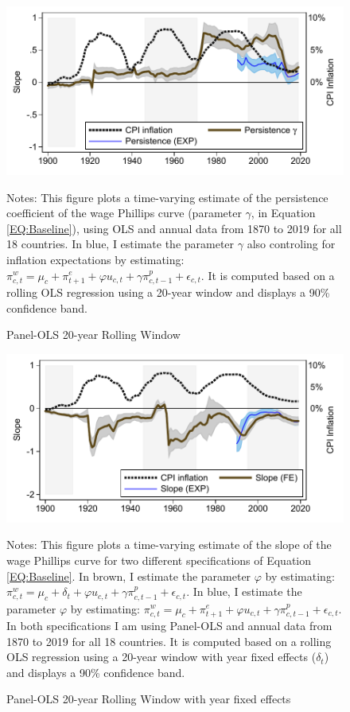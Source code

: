 \documentclass[12pt]{article}
\newcommand{\annote}[1]{\parbox{\textwidth}{\renewcommand{\baselinestretch}{1.0}\vspace{12pt} \footnotesize Notes: #1}}
\begin{document}
\begin{appendices}
\begin{singlespace}
\begin{figure}[h!]
    \centering
    \caption{Panel-OLS 20-year Rolling Window}
    \includegraphics[scale=0.9]{../Output/Figures/Figure_A2}
    \annote{\footnotesize This figure plots a time-varying estimate of the persistence coefficient of the wage Phillips curve (parameter $\gamma$, in Equation \eqref{EQ:Baseline}), using OLS and annual data from 1870 to 2019 for all 18 countries. In blue, I estimate the parameter $\gamma$ also controling for inflation expectations by estimating: $\pi_{c,t}^w = \mu_c + \pi_{t+1}^e + \varphi u_{c,t} + \gamma \pi_{c,t-1}^p + \epsilon_{c,t}$. It is computed based on a rolling OLS regression using a 20-year window and displays a 90\% confidence band.}
    \label{F:RWIV_gamma}
\end{figure}

\begin{figure}[h!]
    \centering
    \caption{Panel-OLS 20-year Rolling Window with year fixed effects}
    \includegraphics[scale=0.9]{../Output/Figures/Figure_A3}
    \annote{\footnotesize This figure plots a time-varying estimate of the slope of the wage Phillips curve for two different specifications of Equation \eqref{EQ:Baseline}. In brown, I estimate the parameter $\varphi$  by estimating: $\pi_{c,t}^w = \mu_c + \delta_t + \varphi u_{c,t} + \gamma \pi_{c,t-1}^p + \epsilon_{c,t}$. In blue, I estimate the parameter $\varphi$  by estimating: $\pi_{c,t}^w = \mu_c + \pi_{t+1}^e + \varphi u_{c,t} + \gamma \pi_{c,t-1}^p + \epsilon_{c,t}$. In both specifications I am using Panel-OLS and annual data from 1870 to 2019 for all 18 countries. It is computed based on a rolling OLS regression using a 20-year window with year fixed effects ($\delta_t$) and displays a 90\% confidence band.}
    \label{F:RWIV2}
\end{figure}


\end{singlespace}
\end{appendices}
\end{document}
